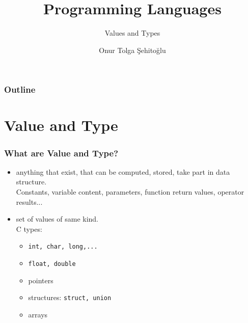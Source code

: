 \usepackage{etex}
\usepackage{tikz} 
\usetikzlibrary{positioning,shapes,fit,arrows}
\usepackage[utf8]{inputenc}
\usepackage{listings}
\usepackage{multicol}

{
  \usepackage{fullpage}
  \usepackage{pgf}
  \usepackage{hyperref}
}

{

}


\title{Programming Languages}
\subtitle{Values and Types}
\author{Onur Tolga Şehitoğlu}
\subject{Values and Types}
\date{}
	\titlegraphic{\insertmetutitle\insertlicense}



%
%
%

 \frame[plain]{\maketitle}
 \begin{frame}
 \frametitle{Outline}
 \small
 \begin{multicols}{2}
 \tableofcontents
 \end{multicols}
 \end{frame}

\section{Value and Type}
\begin{frame}
\frametitle{What are Value and Type?}
\begin{itemize}
 \item {} anything that exist, that can be computed, stored, take part in data
 structure.\\
 	Constants, variable content, parameters, function return values, operator results...
\item {} set of values of same kind.\\
	\pause C types:
	\begin{itemize}
		\item \texttt{int, char, long,...}
		\item \texttt{float, double}
		\item pointers
		\item structures: \texttt{struct, union}
		\item arrays
	\end{itemize}
\end{itemize}
\end{frame}


